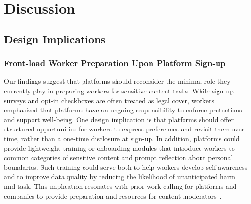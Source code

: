\section{Discussion}


\subsection{Design Implications}
\subsubsection{Front-load Worker Preparation Upon Platform Sign-up}
Our findings suggest that platforms should reconsider the minimal role they currently play in preparing workers for sensitive content tasks. While sign-up surveys and opt-in checkboxes are often treated as legal cover, workers emphasized that platforms have an ongoing responsibility to enforce protections and support well-being. One design implication is that platforms should offer structured opportunities for workers to express preferences and revisit them over time, rather than a one-time disclosure at sign-up. In addition, platforms could provide lightweight training or onboarding modules that introduce workers to common categories of sensitive content and prompt reflection about personal boundaries. Such training could serve both to help workers develop self-awareness and to improve data quality by reducing the likelihood of unanticipated harm mid-task. This implication resonates with prior work calling for platforms and companies to provide preparation and resources for content moderators~\cite{qian2025aura, steiger_psychological_2021, steiger2022effects}. 



